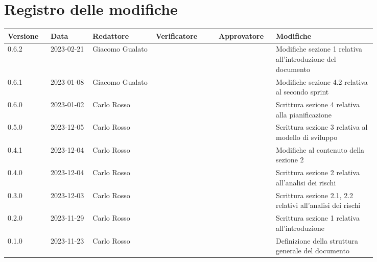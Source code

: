 \section*{Registro delle modifiche}

{
\renewcommand{\arraystretch}{1.5}
\scriptsize
\begin{longtable}{p{0.10\linewidth}p{0.10\linewidth}p{0.15\linewidth}p{0.15\linewidth}p{0.10\linewidth}p{0.24\linewidth}}
	\textbf{Versione} & \textbf{Data} & \textbf{Redattore} & \textbf{Verificatore} & \textbf{Approvatore} & \textbf{Modifiche}	\\
	\toprule
	0.6.2             & 2023-02-21    & Giacomo Gualato    & 	&	& Modifiche sezione 1 relativa all'introduzione del documento 		\\
	\hline
	0.6.1             & 2023-01-08    & Giacomo Gualato    & 	&	& Modifiche sezione 4.2 relativa al secondo sprint 		\\
	\hline
	0.6.0             & 2023-01-02    & Carlo Rosso        & 	&	& Scrittura sezione 4 relativa alla pianificazione 		\\
	\hline
	0.5.0             & 2023-12-05    & Carlo Rosso        & 	&	& Scrittura sezione 3 relativa al modello di sviluppo	\\
	\hline
	0.4.1             & 2023-12-04    & Carlo Rosso        & 	&	& Modifiche al contenuto della sezione 2				\\
	\hline
	0.4.0             & 2023-12-04    & Carlo Rosso        & 	&	& Scrittura sezione 2 relativa all'analisi dei rischi	\\
	\hline
	0.3.0             & 2023-12-03    & Carlo Rosso        & 	&	& Scrittura sezione 2.1, 2.2 relativi all'analisi dei rischi	\\
	\hline
	0.2.0             & 2023-11-29    & Carlo Rosso        & 	&	& Scrittura sezione 1 relativa all'introduzione			\\
	\hline
	0.1.0             & 2023-11-23    & Carlo Rosso        & 	&	& Definizione della struttura generale del documento	\\
	\bottomrule
\end{longtable}
}